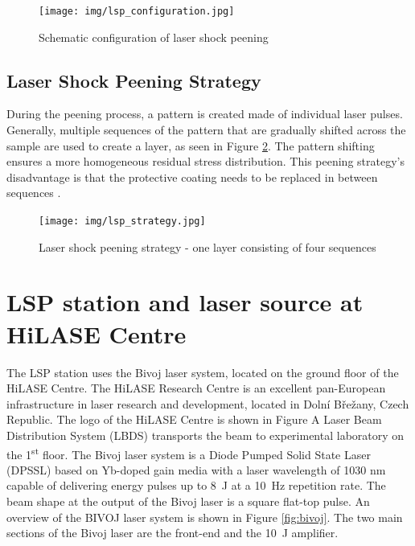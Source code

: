 \begin{figure}[h]
    \centering
    \texttt{[image: img/lsp\_configuration.jpg]}
    \caption{Schematic configuration of laser shock peening}
    \label{fig:lspconfiguration}
\end{figure}

\subsection{Laser Shock Peening Strategy}
During the peening process, a pattern is created made of individual laser pulses. Generally, multiple sequences of the pattern that are gradually shifted across the sample are used to create a layer, as seen in Figure \ref{fig:lspstrategy}. The pattern shifting ensures a more homogeneous residual stress distribution. This peening strategy's disadvantage is that the protective coating needs to be replaced in between sequences \cite{kaufman}.

\begin{figure}[h]
    \centering
    \texttt{[image: img/lsp\_strategy.jpg]}
    \caption{Laser shock peening strategy - one layer consisting of four sequences}
    \label{fig:lspstrategy}
\end{figure}

\section{LSP station and laser source at HiLASE Centre}

The LSP station uses the Bivoj laser system, located on the ground floor of the HiLASE Centre. The HiLASE Research Centre is an excellent pan-European infrastructure in laser research and development, located in Dolní Břežany, Czech Republic. The logo of the HiLASE Centre is shown in Figure A Laser Beam Distribution System (LBDS) transports the beam to
experimental laboratory on the 1\textsuperscript{st} floor. The Bivoj laser system is a Diode Pumped Solid State Laser (DPSSL) based on Yb-doped gain media with a laser wavelength of 1030 nm capable of delivering energy pulses up to \SI{8}{\joule} at a \SI{10}{\hertz} repetition rate. The beam shape at the output of the Bivoj laser is a square flat-top pulse. An overview of the BIVOJ laser system is shown in Figure \ref{fig:bivoj}. The two main sections of the Bivoj laser are the front-end and the \SI{10}{\joule} amplifier.



